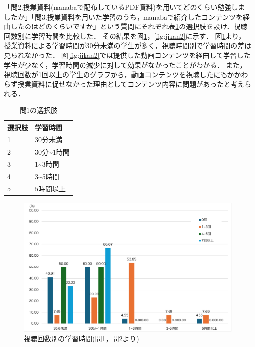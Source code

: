 \documentclass[12pt,a4j,titlepage]{ltjsarticle}
\begin{document}
「問2.授業資料(manabaで配布しているPDF資料)を用いてどのくらい勉強しましたか」「問3.授業資料を用いた学習のうち，manabaで紹介したコンテンツを経由したのはどのくらいですか」という質問にそれぞれ表\ref{tb:anke2_8}の選択肢を設け．視聴回数別に学習時間を比較した．
その結果を図\ref{fig:jikan}，\ref{fig:jikan2}に示す．
図\ref{fig:jikan}より，授業資料による学習時間が30分未満の学生が多く，視聴時間別で学習時間の差は見られなかった．
図\ref{fig:jikan2}では提供した動画コンテンツを経由して学習した学生が少なく，学習時間の減少に対して効果がなかったことがわかる．
また，視聴回数が1回以上の学生のグラフから，動画コンテンツを視聴したにもかかわらず授業資料に促せなかった理由としてコンテンツ内容に問題があったと考えられる．

\begin{table}[htbp]
  \caption{問1の選択肢}
  \begin{center}
\begin{tabular}{ll}\hline
選択肢 & 学習時間\\ \hline
               1 & 30分未満\\
               2 & 30分\textasciitilde1時間\\
               3 & 1\textasciitilde3時間\\
               4 & 3\textasciitilde5時間\\
               5 & 5時間以上\\
               \hline
                \end{tabular}
                \end{center}
                \label{tb:anke2_8}
                \end{table}

\begin{figure}[!htb]
  \centering
  \includegraphics[width=15cm]{視聴回数別学習時間.pdf}
  \caption{視聴回数別の学習時間(問1，問2より)}
  \label{fig:jikan}
\end{figure}
\end{document}
